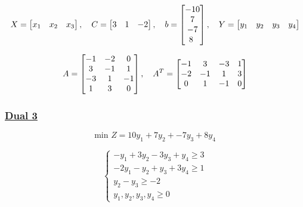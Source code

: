 \vspace{1.25cm}
\[
X = \left[\begin{matrix} x_1 & x_2 & x_3 \end{matrix}\right], \hspace{0.35cm}
C = \left[\begin{matrix} 3 & 1 & -2 \end{matrix}\right], \hspace{0.35cm}
b = \left[\begin{matrix} -10 \\ 7\\-7\\8 \ \end{matrix}\right], \hspace{0.35cm}
Y = \left[\begin{matrix} y_1 & y_2 & y_3& y_4 \end{matrix}\right]
\]

\vspace{0.5cm}

\[
A = \left[\begin{matrix}   -1 & -2 & 0 \\
                           3 & -1 & 1\\
                           -3 & 1 & -1\\
                           1 & 3 & 0
                           \end{matrix}\right], \hspace{0.35cm}
        A^{T} = \left[\begin{matrix}  -1 & 3 & -3 &1 \\
                                      -2 & -1 & 1 &3 \\
                                       0 & 1 & -1 &0
                     \end{matrix}\right]
\]

\newpage
\subsubsection*{\underline{Dual 3}}
\[\text{min } Z = 10y_1 + 7y_2 + -7y_3 +8y_4\]

\[
\left\{
\begin{array}{l}
    -y_{1} + 3y_{2} -3y_{3} + y_{4} \geq 3 \\
    -2y_{1} -y_{2} + y_{3} + 3y_{4} \geq 1 \\
     y_{2} - y_{3}  \geq -2 \\
    y_{1}, y_{2}, y_{3}, y_{4}\geq 0
\end{array}
\right.
\]


